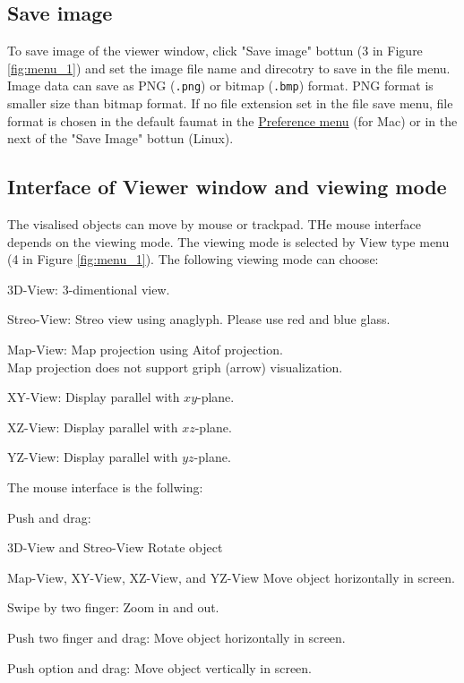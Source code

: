 \subsection{Save image}
To save image of the viewer window, click "Save image" bottun (3 in Figure \ref{fig:menu_1}) and set the image file name and direcotry to save in the file menu. Image data can save as PNG (\verb|.png|) or bitmap (\verb|.bmp|) format. PNG format is smaller size than bitmap format. If no file extension set in the file save menu, file format is chosen in the default faumat in the \hyperref[sec:pref_menu]{Preference menu} (for Mac) or in the next of the "Save Image" bottun (Linux).

\subsection{Interface of Viewer window and viewing mode}
The visalised objects can move by mouse or trackpad. THe mouse interface depends on the viewing mode. The viewing mode is selected by View type menu (4 in Figure \ref{fig:menu_1}). The following viewing mode can choose:
%
\begin{description}
\item{3D-View: } 3-dimentional view.
\item{Streo-View: } Streo view using anaglyph. Please use red and blue glass.
\item{Map-View: }  Map projection using Aitof projection. \\
Map projection does not support griph (arrow) visualization.
\item{XY-View: }   Display parallel with $xy$-plane.
\item{XZ-View: }   Display parallel with $xz$-plane.
\item{YZ-View: }   Display parallel with $yz$-plane.
\end{description}
%

The mouse interface is the follwing:
\begin{description}
\item{Push and drag: }
  \begin{description}
  \item{3D-View and Streo-View}  Rotate object
  \item{Map-View, XY-View, XZ-View, and YZ-View} Move object horizontally in screen.
  \end{description}
\item{Swipe by two finger: } Zoom in and out.
\item{Push two finger and drag: } Move object horizontally in screen.
\item{Push option and drag: } Move object vertically in screen.
\end{description}

